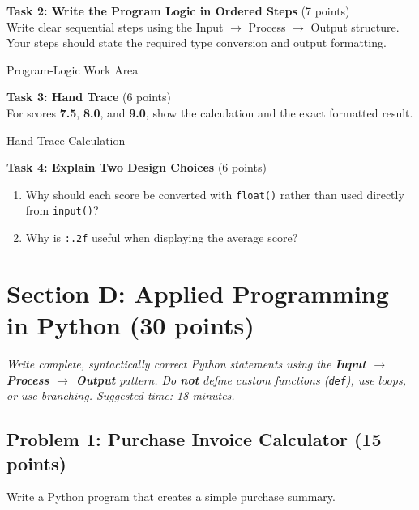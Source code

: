 \documentclass[11pt,a4paper]{article}
\begin{document}
\vspace{1mm}
\textbf{Task 2: Write the Program Logic in Ordered Steps} (7 points)\\
Write clear sequential steps using the Input $\rightarrow$ Process $\rightarrow$ Output structure. Your steps should state the required type conversion and output formatting.

\begin{answerbox}[height=8.0cm]{Program-Logic Work Area}
\end{answerbox}

\vspace{1mm}
\textbf{Task 3: Hand Trace} (6 points)\\
For scores \textbf{7.5}, \textbf{8.0}, and \textbf{9.0}, show the calculation and the exact formatted result.

\begin{answerbox}[height=3.7cm]{Hand-Trace Calculation}
\end{answerbox}

\vspace{1mm}
\textbf{Task 4: Explain Two Design Choices} (6 points)
\begin{enumerate}[label=\alph*),leftmargin=2em]
  \item Why should each score be converted with \texttt{float()} rather than used directly from \texttt{input()}?\\[5mm]
  \hrulefill
  \item Why is \texttt{:.2f} useful when displaying the average score?\\[5mm]
  \hrulefill
\end{enumerate}

\newpage


\section*{Section D: Applied Programming in Python \hfill \normalsize\normalfont(30 points)}
\textit{Write complete, syntactically correct Python statements using the \textbf{Input $\rightarrow$ Process $\rightarrow$ Output} pattern. Do \textbf{not} define custom functions (\texttt{def}), use loops, or use branching. Suggested time: 18 minutes.}

\subsection*{Problem 1: Purchase Invoice Calculator (15 points)}
Write a Python program that creates a simple purchase summary.
\end{document}
